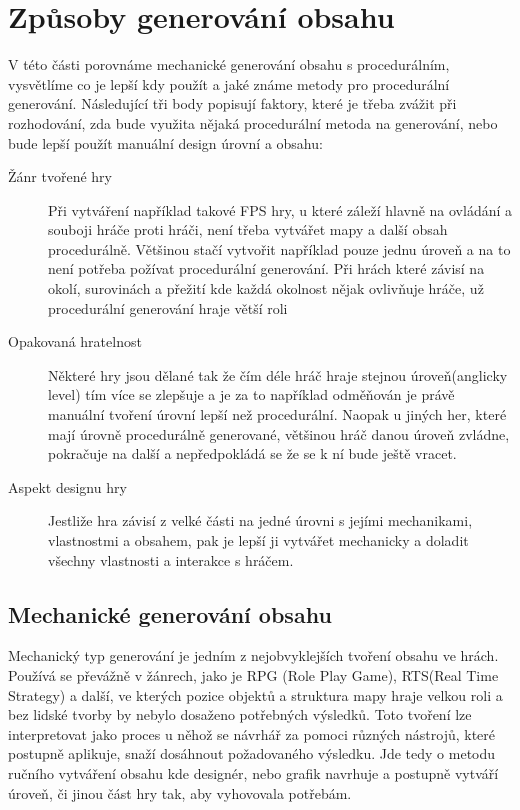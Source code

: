 \section{Způsoby generování obsahu}
V této části porovnáme mechanické generování obsahu s procedurálním, vysvětlíme co je lepší kdy použít a jaké známe metody pro procedurální generování. Následující tři body popisují faktory, které je třeba zvážit při rozhodování, zda bude využita nějaká procedurální metoda na generování, nebo bude lepší použít manuální design úrovní a obsahu:
\begin{description}
	\item[Žánr tvořené hry] Při vytváření například takové FPS hry, u které záleží hlavně na ovládání a souboji hráče proti hráči, není třeba vytvářet mapy a další obsah procedurálně. Většinou stačí vytvořit například pouze jednu úroveň a na to není potřeba požívat procedurální generování. Při hrách které závisí na okolí, surovinách a přežití kde každá okolnost nějak ovlivňuje hráče, už procedurální generování hraje větší roli
	\item[Opakovaná hratelnost] Některé hry jsou dělané tak že čím déle hráč hraje stejnou úroveň(anglicky level) tím více se zlepšuje a je za to například odměňován je právě manuální tvoření úrovní lepší než procedurální. Naopak u jiných her, které mají úrovně procedurálně generované, většinou hráč danou úroveň zvládne, pokračuje na další a nepředpokládá se že se k ní bude ještě vracet.
	\item[Aspekt designu hry] Jestliže hra závisí z velké části na jedné úrovni s jejími mechanikami, vlastnostmi a obsahem, pak je lepší ji vytvářet mechanicky a doladit všechny vlastnosti a interakce s hráčem.
\end{description}


\subsection{Mechanické generování obsahu}
\label{traditional}
Mechanický typ generování je jedním z nejobvyklejších tvoření obsahu ve hrách. Používá se převážně v žánrech, jako je RPG (Role Play Game), RTS(Real Time Strategy) a další, ve kterých pozice objektů a struktura mapy hraje velkou roli a bez lidské tvorby by nebylo dosaženo potřebných výsledků. Toto tvoření lze interpretovat jako proces u něhož se návrhář za pomoci různých nástrojů, které postupně aplikuje, snaží dosáhnout požadovaného výsledku. Jde tedy o metodu ručního vytváření obsahu kde designér, nebo grafik navrhuje a postupně vytváří úroveň, či jinou část hry tak, aby vyhovovala potřebám.
	
